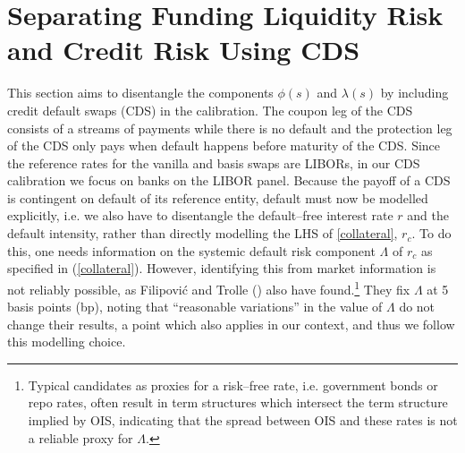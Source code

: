 \documentclass[12pt,a4paper]{article}
\theoremstyle{plain}
\numberwithin{equation}{section}
\begin{document}
\section{Separating Funding Liquidity Risk and Credit Risk Using CDS}\label{CDScal}
This section aims to disentangle the components $\phi(s)$ and $\lambda(s)$ by including credit default swaps (CDS) in the calibration. The coupon leg of the CDS consists of a streams of payments while there is no default and the protection leg of the CDS only pays when default happens before maturity of the CDS. Since the reference rates for the vanilla and basis swaps are LIBORs, in our CDS calibration we focus on banks on the LIBOR panel. Because the payoff of a CDS is contingent on default of its reference entity, default must now be modelled explicitly, i.e. we also have to disentangle the default--free interest rate $r$ and the default intensity, rather than directly modelling the LHS of \ref{collateral}, $r_c$. To do this, one needs information on the systemic default risk component $\Lambda$ of $r_c$ as specified in (\ref{collateral}). However, identifying this from market information is not reliably possible, as Filipovi\'c and Trolle (\citeyear*{FilTro:2013}) also have found.\footnote{Typical candidates as proxies for a risk--free rate, i.e. government bonds or repo rates, often result in term structures which intersect the term structure implied by OIS, indicating that the spread between OIS and these rates is not a reliable proxy for $\Lambda$.} They fix $\Lambda$ at 5 basis points (bp), noting that ``reasonable variations'' in the value of $\Lambda$ do not change their results, a point which also applies in our context, and thus we follow this modelling choice.

%
\end{document}
